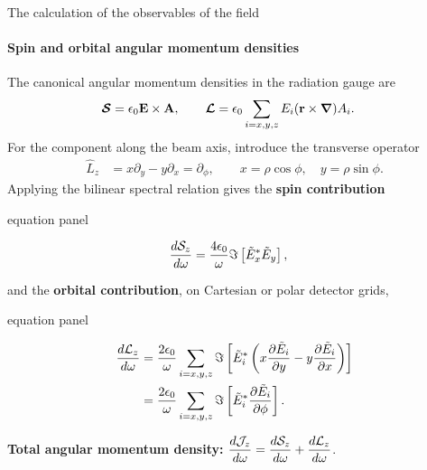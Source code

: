 \documentclass[aspectratio=169, 10pt]{beamer}
\newcommand{\theorylabel}[1]{{\color{ValidationTeal}\textbf{#1}}}
\newenvironment{equationpanel}{%
  \par
  \begin{beamercolorbox}[wd=\linewidth,sep=0pt]{equation panel}%
  }{%
  \end{beamercolorbox}%
}
\begin{document}
\begin{frame}{The calculation of the observables of the field}
  \framesubtitle{Spin and orbital angular momentum densities}
  \setlength{\parskip}{2pt}
  \setlength{\abovedisplayskip}{1pt}
  \setlength{\belowdisplayskip}{1pt}
  \setlength{\abovedisplayshortskip}{1pt}
  \setlength{\belowdisplayshortskip}{1pt}


  The canonical angular momentum densities in the radiation gauge are
  \begin{align*}
    {\boldsymbol{\cal S}}&=\epsilon_0{\bf E}\times{\bf A},\qquad
    {\boldsymbol{\cal L}}=\epsilon_0\sum_{i=x,y,z}E_i({\bf r}\times\boldsymbol\nabla)A_i.
  \end{align*}
  For the component along the beam axis, introduce the transverse operator
  \begin{align*}
    \hat L_z&=x\partial_y-y\partial_x=\partial_\phi,
    \qquad x=\rho\cos\phi,\quad y=\rho\sin\phi.
  \end{align*}
  Applying the bilinear spectral relation gives the \theorylabel{spin contribution}
  \begin{equationpanel}
    \begin{align*}
      \frac{d{\cal S}_z}{d\omega}
      &=\frac{4\epsilon_0}{\omega}\Im\left[\tilde E_x^*\tilde E_y\right],
    \end{align*}
  \end{equationpanel}
  and the \theorylabel{orbital contribution}, on Cartesian or polar detector grids,
  \begin{equationpanel}
    \begin{align*}
      \frac{d{\cal L}_z}{d\omega}
      &=\frac{2\epsilon_0}{\omega}\sum_{i=x,y,z}
      \Im\left[\tilde E_i^*\left(x\frac{\partial\tilde E_i}{\partial y}
      -y\frac{\partial\tilde E_i}{\partial x}\right)\right]\\
      &=\frac{2\epsilon_0}{\omega}\sum_{i=x,y,z}
      \Im\left[\tilde E_i^*\frac{\partial\tilde E_i}{\partial\phi}\right].
    \end{align*}
  \end{equationpanel}
  \theorylabel{Total angular momentum density:}\quad
  $\displaystyle\frac{d{\cal J}_z}{d\omega}
    =\frac{d{\cal S}_z}{d\omega}+\frac{d{\cal L}_z}{d\omega}$.
\end{frame}
\end{document}
